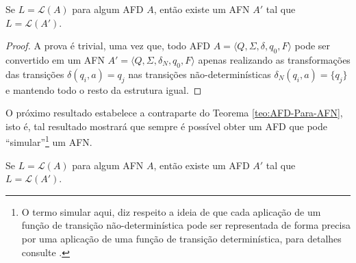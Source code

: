 \begin{theorem}\label{teo:AFD-Para-AFN}
	Se $L = \mathcal{L}(A)$ para algum AFD $A$, então existe um AFN $A'$ tal que $L = \mathcal{L}(A')$.
\end{theorem}

\begin{proof}
	A prova é trivial, uma vez que, todo AFD $A = \langle Q, \Sigma, \delta, q_0, F\rangle$ pode ser convertido em um AFN $A' = \langle Q, \Sigma, \delta_N, q_0, F\rangle$ apenas realizando as transformações das transições $\delta(q_i, a) = q_j$ nas transições não-determinísticas $\delta_N(q_i, a) = \{q_j\}$ e mantendo todo o resto da estrutura igual.
\end{proof}

O próximo resultado estabelece a contraparte do Teorema \ref{teo:AFD-Para-AFN}, isto é, tal resultado mostrará que sempre é possível obter um AFD que pode ``simular''\footnote{O termo simular aqui, diz respeito a ideia de que cada aplicação de um função de transição não-determinística pode ser representada de forma precisa por uma aplicação de uma função de transição determinística, para detalhes consulte \cite{hopcroft2008, menezes1998LFA}.} um AFN.

\begin{theorem}\label{teo:AFN-Para-AFD}
	Se $L = \mathcal{L}(A)$ para algum AFN $A$, então existe um AFD $A'$ tal que $L = \mathcal{L}(A')$.
\end{theorem}


